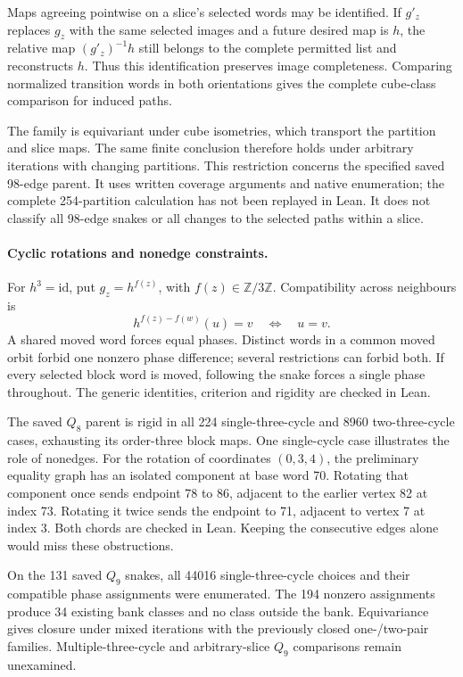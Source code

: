 \documentclass[11pt,a4paper]{article}
\theoremstyle{definition}
\theoremstyle{remark}
\begin{document}
Maps agreeing pointwise on a slice's selected words may be identified.
If $g'_z$ replaces $g_z$ with the same selected images and a future
desired map is $h$, the relative map $(g'_z)^{-1}h$ still belongs
to the complete permitted list and reconstructs $h$. Thus this
identification preserves image completeness. Comparing normalized
transition words in both orientations gives the complete cube-class
comparison for induced paths.

The family is equivariant under cube isometries, which transport the
partition and slice maps. The same finite conclusion therefore
holds under arbitrary iterations with changing partitions. This
restriction concerns the specified saved 98-edge parent. It uses
written coverage arguments and native enumeration; the complete
254-partition calculation has not been replayed in Lean. It does
not classify all 98-edge snakes or all changes to the selected
paths within a slice.

\paragraph{Cyclic rotations and nonedge constraints.}
For $h^3=\mathrm{id}$, put $g_z=h^{f(z)}$, with
$f(z)\in\mathbb Z/3\mathbb Z$. Compatibility across neighbours is
\[
h^{f(z)-f(w)}(u)=v\quad\Longleftrightarrow\quad u=v.
\]
A shared moved word forces equal phases. Distinct words in a common
moved orbit forbid one nonzero phase difference; several restrictions
can forbid both. If every selected block word is moved, following
the snake forces a single phase throughout. The generic identities,
criterion and rigidity are checked in Lean.

The saved $Q_8$ parent is rigid in all 224 single-three-cycle and
8960 two-three-cycle cases, exhausting its order-three block maps.
One single-cycle case illustrates the role of nonedges. For the
rotation of coordinates $(0,3,4)$, the preliminary equality graph
has an isolated component at base word 70. Rotating that component
once sends endpoint 78 to 86, adjacent to the earlier vertex 82 at
index 73. Rotating it twice sends the endpoint to 71, adjacent to
vertex 7 at index 3. Both chords are checked in Lean. Keeping the
consecutive edges alone would miss these obstructions.

On the 131 saved $Q_9$ snakes, all 44016 single-three-cycle choices
and their compatible phase assignments were enumerated. The 194
nonzero assignments produce 34 existing bank classes and no class
outside the bank. Equivariance gives closure under mixed iterations
with the previously closed one-/two-pair families. Multiple-three-cycle
and arbitrary-slice $Q_9$ comparisons remain unexamined.
\end{document}
